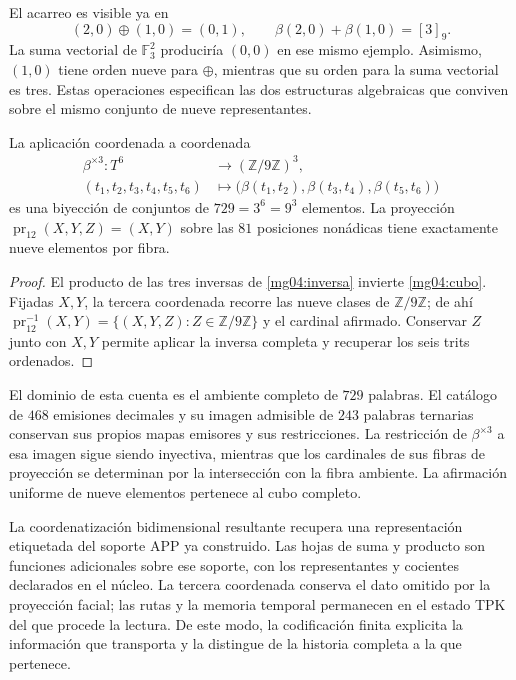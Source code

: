 El acarreo es visible ya en
\[
 (2,0)\oplus(1,0)=(0,1),\qquad
 \beta(2,0)+\beta(1,0)=[3]_9.
\]
La suma vectorial de \(\mathbb F_3^2\) produciría \((0,0)\)
en ese mismo ejemplo. Asimismo, \((1,0)\) tiene orden nueve para
\(\oplus\), mientras que su orden para la suma vectorial es tres.
Estas operaciones especifican las dos estructuras algebraicas que
conviven sobre el mismo conjunto de nueve representantes.

\begin{corollary}
La aplicación coordenada a coordenada
\begin{equation}
 \begin{split}
 \beta^{\times3}:T^6&\longrightarrow(\mathbb Z/9\mathbb Z)^3,\\
 (t_1,t_2,t_3,t_4,t_5,t_6)&\longmapsto
 \bigl(\beta(t_1,t_2),\beta(t_3,t_4),\beta(t_5,t_6)\bigr)
 \end{split}
 \label{mg04:cubo}
\end{equation}
es una biyección de conjuntos de \(729=3^6=9^3\) elementos. La
proyección \(\operatorname{pr}_{12}(X,Y,Z)=(X,Y)\) sobre las
\(81\) posiciones nonádicas tiene exactamente nueve elementos
por fibra.
\end{corollary}

\begin{proof}
El producto de las tres inversas de \eqref{mg04:inversa} invierte
\eqref{mg04:cubo}. Fijadas \(X,Y\), la tercera coordenada
recorre las nueve clases de \(\mathbb Z/9\mathbb Z\); de ahí
\(\operatorname{pr}_{12}^{-1}(X,Y)=
\{(X,Y,Z):Z\in\mathbb Z/9\mathbb Z\}\) y el cardinal afirmado.
Conservar \(Z\) junto con \(X,Y\) permite aplicar la inversa
completa y recuperar los seis trits ordenados.
\end{proof}

El dominio de esta cuenta es el ambiente completo de \(729\)
palabras. El catálogo de \(468\) emisiones decimales y su imagen
admisible de \(243\) palabras ternarias conservan sus propios mapas
emisores y sus restricciones. La restricción de \(\beta^{\times3}\)
a esa imagen sigue siendo inyectiva, mientras que los cardinales de
sus fibras de proyección se determinan por la intersección con la
fibra ambiente. La afirmación uniforme de nueve elementos pertenece
al cubo completo.

La coordenatización bidimensional resultante recupera una representación etiquetada
del soporte APP ya construido. Las hojas de suma y producto son funciones adicionales sobre
ese soporte, con los representantes y cocientes declarados en el núcleo.
La tercera coordenada conserva el dato omitido por la proyección
facial; las rutas y la memoria temporal permanecen en el estado TPK
del que procede la lectura. De este modo, la codificación finita
explicita la información que transporta y la distingue de la historia
completa a la que pertenece.
